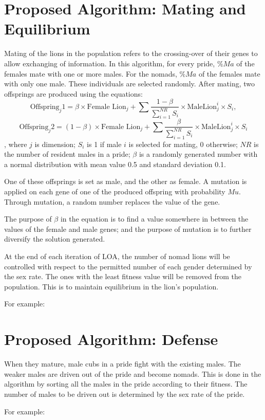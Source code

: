 \section{Proposed Algorithm: Mating and Equilibrium}
Mating of the lions in the population refers to the crossing-over of their genes to allow exchanging of information. In this algorithm, for every pride, $\%Ma$ of the females mate with one or more males. For the nomads, $\%Ma$ of the females mate with only one male. These individuals are selected randomly. After mating, two offsprings are produced using the equations: $$\text{Offspring}_j\text{1}=\beta \times \text{Female Lion}_j +\sum\frac{1-\beta}{\sum_{i=1}^{NR}S_i}\times\text{MaleLion}_j^i\times S_i,$$ $$\text{Offspring}_j\text{2}=(1-\beta) \times \text{Female Lion}_j +\sum\frac{\beta}{\sum_{i=1}^{NR}S_i}\times\text{MaleLion}_j^i\times S_i$$, where $j$ is dimension; $S_i$ is 1 if male $i$ is selected for mating, 0 otherwise; $NR$ is the number of resident males in a pride; $\beta$ is a randomly generated number with a normal distribution with mean value 0.5 and standard deviation 0.1.

One of these offsprings is set as male, and the other as female. A mutation is applied on each gene of one of the produced offspring with probability $Mu$. Through mutation, a random number replaces the value of the gene.

The purpose of $\beta$ in the equation is to find a value somewhere in between the values of the female and male genes; and the purpose of mutation is to further diversify the solution generated.

At the end of each iteration of LOA, the number of nomad lions will be controlled with respect to the permitted number of each gender determined by the sex rate. The ones with the least fitness value will be removed from the population. This is to maintain equilibrium in the lion's population.

For example:

\section{Proposed Algorithm: Defense}
When they mature, male cubs in a pride fight with the existing males. The weaker males are driven out of the pride and become nomads. This is done in the algorithm by sorting all the males in the pride according to their fitness. The number of males to be driven out is determined by the sex rate of the pride.

For example:

